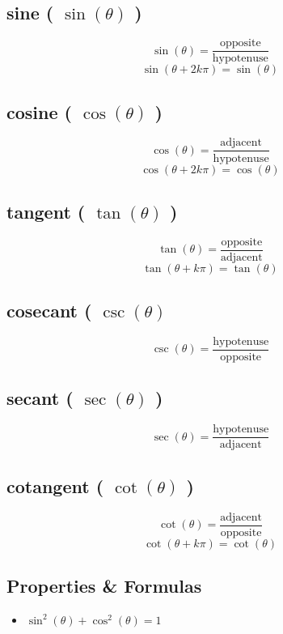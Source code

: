 \subsection{sine ( $\sin(\theta)$ )}\label{sine (sin)}

\[
    \sin(\theta) = \displaystyle \frac{\mathrm{opposite}}{\mathrm{hypotenuse}}
\]
\[    \sin(\theta + 2k\pi) = \sin(\theta)   \]

\subsection{cosine ( $\cos(\theta)$ )}\label{cosine (cos)}

\[
    \cos(\theta) = \displaystyle\frac{\mathrm {adjacent} }{\mathrm {hypotenuse} }
\]
\[  \cos(\theta + 2k\pi ) = \cos(\theta)  \]

\subsection{tangent ( $\tan(\theta)$ )}\label{tangent (tan)}

\[
    \tan(\theta) =\displaystyle \frac {\mathrm {opposite} }{\mathrm {adjacent} }
\]
\[  \tan(\theta + k\pi ) = \tan(\theta)  \]

\subsection{cosecant ( $\csc(\theta)$ }\label{cosecant (csc)}
\[
    \csc(\theta) =\displaystyle\frac {\mathrm {hypotenuse} }{\mathrm {opposite} }
\]

\subsection{secant ( $\sec(\theta)$ )}\label{secant (sec)}
\[
    \sec(\theta) =\displaystyle\frac {\mathrm {hypotenuse} }{\mathrm {adjacent} }
\]

\subsection{cotangent ( $\cot(\theta)$ )}\label{cotangent (cot)}

\[
    \cot(\theta) =\displaystyle\frac {\mathrm {adjacent} }{\mathrm {opposite} }
\]
\[  \cot(\theta + k\pi ) = \cot(\theta)  \]


\subsection{Properties \& Formulas}
\begin{itemize}
    \item \( \sin^2(\theta) + \cos^2(\theta) = 1 \)
\end{itemize}


